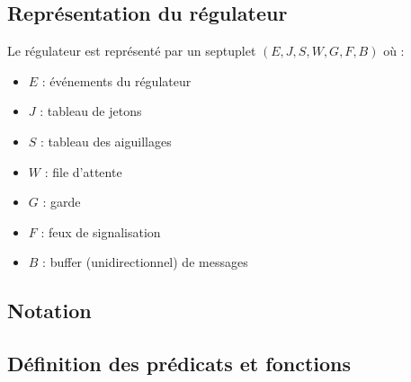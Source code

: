 \documentclass[12pt]{article}
\begin{document}
\subsection{Représentation du régulateur}
Le régulateur est représenté par un septuplet $(E, J, S, W, G, F, B)$ où :
\begin{itemize}
    \item $E$ : événements du régulateur
    \item $J$ : tableau de jetons
    \item $S$ : tableau des aiguillages
    \item $W$ : file d'attente
    \item $G$ : garde
    \item $F$ : feux de signalisation
    \item $B$ : buffer (unidirectionnel) de messages
\end{itemize}


\subsection{Notation}
\iffalse
On note
\\
$\mathbf{O}_{e}$ l'ensemble des ordres des événements
\vspace{0.3cm} \\
dict : $\mathbf{A} \rightarrow \mathbf{B}$ avec $\mathbf{A}$ l'ensemble des clés et $\mathbf{B}$ l'ensemble des valeurs
\\ $\mathbf{A} \times \mathbf{B}$ telque \{ $\langle k,v \rangle$ si $k_{j} \neq k_{i}$ \} \\
\vspace{0.1cm} \\
suppr(D,k) = \bracket{D \backslash \{\langle x,D[x] \rangle\} \text{ si } k = x}{D \text{ sinon}}
\\
\vspace{0.3cm} \\
E : dict avec \bracket{a \in \mathbf{A} | a = \langle id_{t}, numEv \rangle}{\mathbf{B} \subseteq \mathbf{O}_{e}}
\vspace{0.3cm} \\
W : dict avec \bracket{a \in \mathbf{A} | a = \langle id_{c}, val_{j} \rangle}{\mathbf{B} \subseteq \mathbf{N}}
\vspace{0.3cm} \\
Soit un tableau T, on note la mise à jour de T à la position i avec la valeur v par $\majtab{T}{i}{v}$ 
\fi

\subsection{Définition des prédicats et fonctions}
\end{document}
